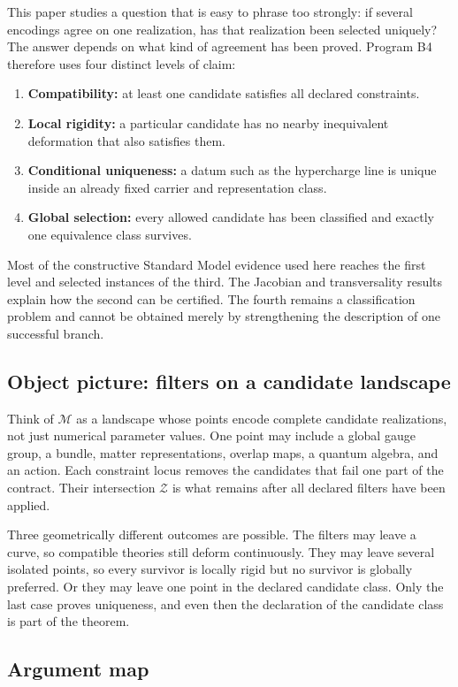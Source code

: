 \documentclass[11pt]{article}
\newcommand{\Mod}{\mathcal M}
\newcommand{\Sol}{\mathcal Z}
\begin{document}
This paper studies a question that is easy to phrase too strongly: if several
encodings agree on one realization, has that realization been selected
uniquely?  The answer depends on what kind of agreement has been proved.
Program B4 therefore uses four distinct levels of claim:
\begin{enumerate}
\item \textbf{Compatibility:} at least one candidate satisfies all declared
constraints.
\item \textbf{Local rigidity:} a particular candidate has no nearby
inequivalent deformation that also satisfies them.
\item \textbf{Conditional uniqueness:} a datum such as the hypercharge line is
unique inside an already fixed carrier and representation class.
\item \textbf{Global selection:} every allowed candidate has been classified
and exactly one equivalence class survives.
\end{enumerate}
Most of the constructive Standard Model evidence used here reaches the first
level and selected instances of the third.  The Jacobian and transversality
results explain how the second can be certified.  The fourth remains a
classification problem and cannot be obtained merely by strengthening the
description of one successful branch.

\subsection{Object picture: filters on a candidate landscape}

Think of $\Mod$ as a landscape whose points encode complete candidate
realizations, not just numerical parameter values.  One point may include a
global gauge group, a bundle, matter representations, overlap maps, a quantum
algebra, and an action.  Each constraint locus removes the candidates that
fail one part of the contract.  Their intersection $\Sol$ is what remains
after all declared filters have been applied.

Three geometrically different outcomes are possible.  The filters may leave a
curve, so compatible theories still deform continuously.  They may leave
several isolated points, so every survivor is locally rigid but no survivor is
globally preferred.  Or they may leave one point in the declared candidate
class.  Only the last case proves uniqueness, and even then the declaration of
the candidate class is part of the theorem.

\subsection{Argument map}
\end{document}
